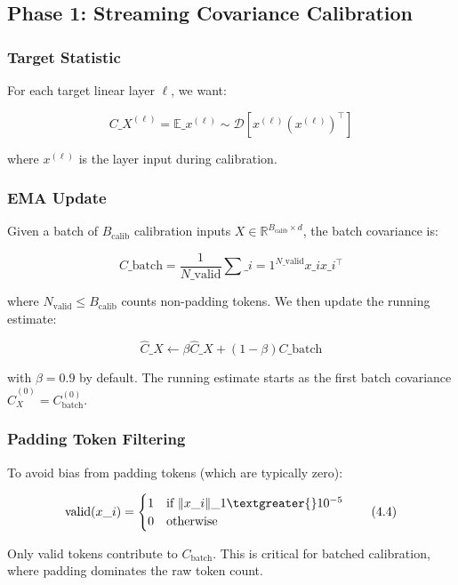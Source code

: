 \subsection{Phase 1: Streaming Covariance Calibration}

\subsubsection{Target Statistic}

For each target linear layer $\ell$, we want:

\[
C\_X^{(\ell)} = \mathbb{E}\_{x^{(\ell)} \sim \mathcal{D}}\!\left[x^{(\ell)} (x^{(\ell)})^\top\right]
\tag{4.1}
\]

where $x^{(\ell)}$ is the layer input during calibration.

\subsubsection{EMA Update}

Given a batch of $B_\text{calib}$ calibration inputs $X \in \mathbb{R}^{B_\text{calib} \times d}$, 
the batch covariance is:

\[
C\_\text{batch} = \frac{1}{N\_\text{valid}} \sum\_{i=1}^{N\_\text{valid}} x\_i x\_i^\top
\tag{4.2}
\]

where $N_\text{valid} \leq B_\text{calib}$ counts non-padding tokens. We 
then update the running estimate:

\[
\hat{C}\_X \leftarrow \beta \hat{C}\_X + (1 - \beta) C\_\text{batch}
\tag{4.3}
\]

with $\beta = 0.9$ by default. The running estimate starts as the first 
batch covariance $\hat{C}_X^{(0)} = C_\text{batch}^{(0)}$.

\subsubsection{Padding Token Filtering}

To avoid bias from padding tokens (which are typically zero):

\[
\text{valid}(x\_i) = \begin{cases} 1 & \text{if } \|x\_i\|\_1 \textgreater{} 10^{-5} \\ 0 & \text{otherwise} \end{cases}
\tag{4.4}
\]

Only valid tokens contribute to $C_\text{batch}$. This is critical for 
batched calibration, where padding dominates the raw token count.

